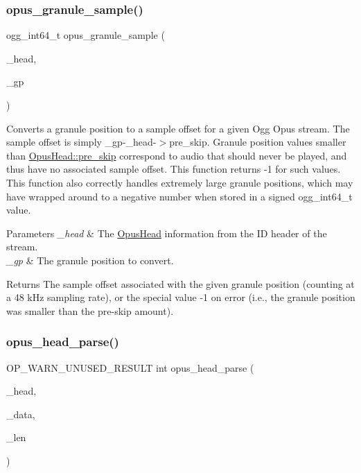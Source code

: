 \subsubsection{\texorpdfstring{opus\_granule\_sample()}{opus\_granule\_sample()}}
{\footnotesize\ttfamily ogg\+\_\+int64\+\_\+t opus\+\_\+granule\+\_\+sample (\begin{DoxyParamCaption}\item[{const \mbox{\hyperlink{struct_opus_head}{Opus\+Head}} $\ast$}]{\+\_\+head,  }\item[{ogg\+\_\+int64\+\_\+t}]{\+\_\+gp }\end{DoxyParamCaption})}

Converts a granule position to a sample offset for a given Ogg Opus stream. The sample offset is simply {\ttfamily \+\_\+gp-\/\+\_\+head-\/$>$pre\+\_\+skip}. Granule position values smaller than \mbox{\hyperlink{struct_opus_head_ab448d3d3289d99f01dca8f19e878d57f}{Opus\+Head\+::pre\+\_\+skip}} correspond to audio that should never be played, and thus have no associated sample offset. This function returns -\/1 for such values. This function also correctly handles extremely large granule positions, which may have wrapped around to a negative number when stored in a signed ogg\+\_\+int64\+\_\+t value. 
\begin{DoxyParams}{Parameters}
{\em \+\_\+head} & The \mbox{\hyperlink{struct_opus_head}{Opus\+Head}} information from the ID header of the stream. \\
\hline
{\em \+\_\+gp} & The granule position to convert. \\
\hline
\end{DoxyParams}
\begin{DoxyReturn}{Returns}
The sample offset associated with the given granule position (counting at a 48 k\+Hz sampling rate), or the special value -\/1 on error (i.\+e., the granule position was smaller than the pre-\/skip amount). 
\end{DoxyReturn}
\mbox{\label{group__header__info_gac3259b44ac8dfac93c7adf708de96d78}} 
\subsubsection{\texorpdfstring{opus\_head\_parse()}{opus\_head\_parse()}}
{\footnotesize\ttfamily O\+P\+\_\+\+W\+A\+R\+N\+\_\+\+U\+N\+U\+S\+E\+D\+\_\+\+R\+E\+S\+U\+LT int opus\+\_\+head\+\_\+parse (\begin{DoxyParamCaption}\item[{\mbox{\hyperlink{struct_opus_head}{Opus\+Head}} $\ast$}]{\+\_\+head,  }\item[{const unsigned char $\ast$}]{\+\_\+data,  }\item[{size\+\_\+t}]{\+\_\+len }\end{DoxyParamCaption})}

